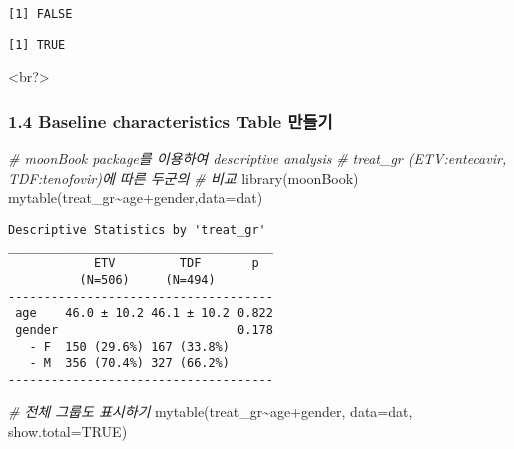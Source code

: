 \documentclass[
]{article}
\newenvironment{Shaded}{\begin{snugshade}}{\end{snugshade}}
\newcommand{\AttributeTok}[1]{\textcolor[rgb]{0.77,0.63,0.00}{#1}}
\newcommand{\CommentTok}[1]{\textcolor[rgb]{0.56,0.35,0.01}{\textit{#1}}}
\newcommand{\ConstantTok}[1]{\textcolor[rgb]{0.00,0.00,0.00}{#1}}
\newcommand{\FunctionTok}[1]{\textcolor[rgb]{0.00,0.00,0.00}{#1}}
\newcommand{\NormalTok}[1]{#1}
\newcommand{\SpecialCharTok}[1]{\textcolor[rgb]{0.00,0.00,0.00}{#1}}
\begin{document}
\begin{verbatim}
[1] FALSE
\end{verbatim}

\begin{Shaded}
\end{Shaded}

\begin{verbatim}
[1] TRUE
\end{verbatim}

\textless br?\textgreater{}

\hypertarget{baseline-characteristics-table-uxb9ccuxb4e4uxae30}{%
\subsubsection{1.4 Baseline characteristics Table
만들기}\label{baseline-characteristics-table-uxb9ccuxb4e4uxae30}}

\begin{Shaded}
\begin{Highlighting}[]
\CommentTok{\# moonBook package를 이용하여 descriptive analysis}
\CommentTok{\# treat\_gr (ETV:entecavir, TDF:tenofovir)에 따른 두군의 \# 비교}
\FunctionTok{library}\NormalTok{(moonBook)}
\FunctionTok{mytable}\NormalTok{(treat\_gr}\SpecialCharTok{\textasciitilde{}}\NormalTok{age}\SpecialCharTok{+}\NormalTok{gender,}\AttributeTok{data=}\NormalTok{dat)}
\end{Highlighting}
\end{Shaded}

\begin{verbatim}
Descriptive Statistics by 'treat_gr'
_____________________________________ 
            ETV         TDF       p  
          (N=506)     (N=494)  
------------------------------------- 
 age    46.0 ± 10.2 46.1 ± 10.2 0.822
 gender                         0.178
   - F  150 (29.6%) 167 (33.8%)      
   - M  356 (70.4%) 327 (66.2%)      
------------------------------------- 
\end{verbatim}

\begin{Shaded}
\begin{Highlighting}[]
\CommentTok{\# 전체 그룹도 표시하기}
\FunctionTok{mytable}\NormalTok{(treat\_gr}\SpecialCharTok{\textasciitilde{}}\NormalTok{age}\SpecialCharTok{+}\NormalTok{gender, }\AttributeTok{data=}\NormalTok{dat, }\AttributeTok{show.total=}\ConstantTok{TRUE}\NormalTok{)}
\end{Highlighting}
\end{Shaded}
\end{document}
